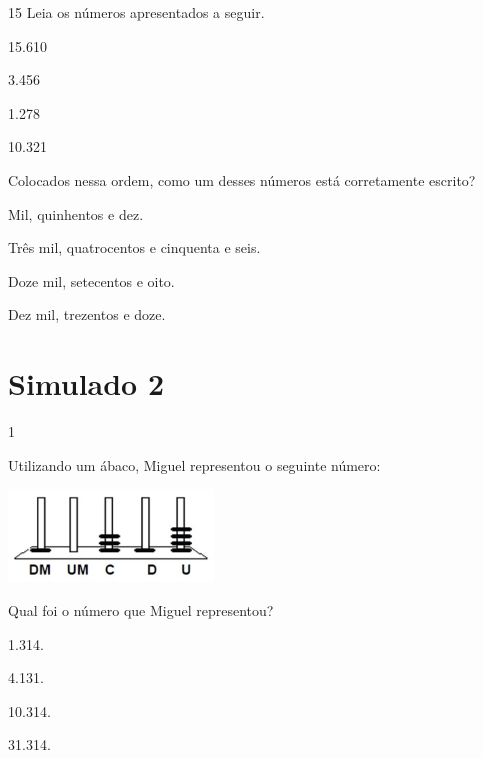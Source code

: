 \begin{mdframed}[linewidth=2pt,linecolor=salmao,roundcorner=2pt]
\begin{escolha}
{\begin{escolha}
\num{15} Leia os números apresentados a seguir.

\begin{center}
\begin{mdframed}[linewidth=2pt,linecolor=azul!20,backgroundcolor=azul!20,roundcorner=2pt]
15.610

3.456

1.278

10.321
\end{mdframed}
\end{center}

Colocados nessa ordem, como um desses números está corretamente escrito?

\begin{escolha}
\item Mil, quinhentos e dez.

\item Três mil, quatrocentos e cinquenta e seis.

\item Doze mil, setecentos e oito.

\item Dez mil, trezentos e doze.
\end{escolha}


\chapter{Simulado 2}

\num{1}

Utilizando um ábaco, Miguel representou o seguinte número:

\includegraphics[width=2.14744in,height=0.97003in]{media/image152.png}


Qual foi o número que Miguel representou?

\begin{escolha}
\item
  1.314.
\item
  4.131.
\item
  10.314.
\item
  31.314.
\end{escolha}


\end{escolha}}
\end{escolha}
\end{mdframed}
